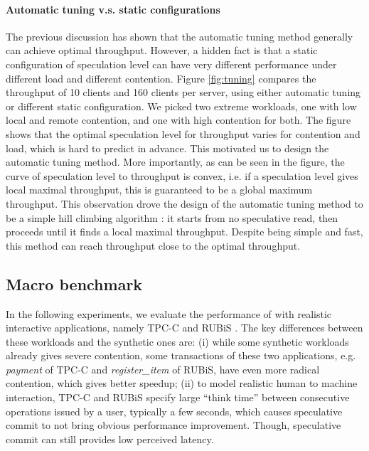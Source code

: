 \paragraph{Automatic tuning v.s. static configurations} The previous discussion has shown that the automatic tuning method generally can achieve optimal throughput. However, a hidden fact is that a static configuration of speculation level can have very different performance under different load and different contention. Figure \ref{fig:tuning} compares the throughput of 10 clients and 160 clients per server, using either automatic tuning or different static configuration. We picked two extreme workloads, one with low local and remote contention, and one with high contention for both. The figure shows that the optimal speculation level for throughput varies for contention and load, which is hard to predict in advance. This motivated us to design the automatic tuning method. More importantly, as can be seen in the figure, the curve of speculation level to throughput is convex, i.e. if a speculation level gives local maximal throughput, this is guaranteed to be a global maximum throughput. This observation drove the design of the automatic tuning method to be a simple hill climbing algorithm \cite{hillclimbing}: it starts from no speculative read, then proceeds until it finds a local maximal throughput. Despite being simple and fast, this method can reach throughput close to the optimal throughput.




\subsection{Macro benchmark}
In the following experiments, we evaluate the performance of \specula with realistic interactive applications, namely TPC-C\cite{tpcc} and RUBiS \cite{rubis}. The key differences between these workloads and the synthetic ones are: (i) while some synthetic workloads already gives severe contention, some transactions of these two applications, e.g. \textit{payment} of TPC-C and \textit{register\_item} of RUBiS, have even more radical contention, which gives \specula better speedup; (ii) to model realistic human to machine interaction, TPC-C and RUBiS specify large ``think time'' between consecutive operations issued by a user, typically a few seconds, which causes speculative commit to not bring obvious performance improvement. Though, speculative commit can still provides low perceived latency.

